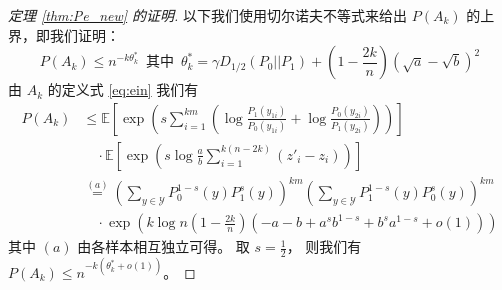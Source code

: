 \begin{proof}[定理 \ref{thm:Pe_new} 的证明]

以下我们使用切尔诺夫不等式来给出 $P(A_k)$
的上界，即我们证明：
$$
P(A_k) \leq n^{-k\theta^*_k} 
\,\textrm{ 其中 }\, \theta^*_k=\gamma D_{1/2}(P_0||P_1)
+\left(1-\frac{2k}{n} \right)\left(\sqrt{a}-\sqrt{b}
\right)^2
$$
由 $A_k$ 的定义式 \eqref{eq:ein} 我们有
\begin{align*}
P(A_k) &\leq \mathbb{E}
\left[\exp \left( s\sum_{i=1}^{km}
\left( \log \frac{P_1(y_{1i})}
    {P_0(y_{1i})}
+ \log \frac{P_0(y_{2i})}
    {P_1(y_{2i})} \right)
\right)\right]\\
&\quad \cdot \mathbb{E}
\left[\exp\left(s\log \frac{a}{b}\sum_{i=1}^{k(n-2k)} (z'_i - z_i )\right)
\right] \\
& \stackrel{(a)}{=}
\left(\sum_{y\in \mathcal{Y}}
P_0^{1-s}(y)P_1^{s}(y)\right)^{km}
\left(\sum_{y\in \mathcal{Y}} P_1^{1-s}(y) P_0^{s}(y)
\right)^{km}\\
&   \quad \cdot \exp\left(
    k\log n \left(1-\frac{2k}{n} \right)
    (-a-b+a^sb^{1-s}+b^sa^{1-s} +o(1)) 
    \right)
\end{align*}
其中 $(a)$ 由各样本相互独立可得。 取 $s=\frac{1}{2}$，
则我们有
$P(A_k) \leq  n^{-k(\theta^*_k+o(1))}$。


\end{proof}

